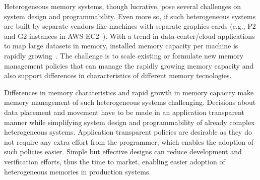 
Heterogeneous memory systems, though lucrative, pose several challenges on system
design and programmability. Even more so, if such heterogeneous systems are built by
separate vendors like machines with separate graphics cards (e.g., P2 and G2
instances in AWS EC2~\cite{awsinstances}). With a
trend in data-center/cloud applications to map large datasets in memory,
installed memory capacity per machine is rapidly growing~\cite{spark}. The
challenge is to scale existing or formulate new memory management policies that
can manage the rapidly growing memory capacity and also support differences in
characteristics of different memory tecnologies.


Differences in memory charateristics and rapid growth in memory capacity make
memory management of such heterogeneous systems challenging. Decisions about
data placement and movement have to be made in an application transparent manner
while simplifying system design and programmability of already complex
heterogeneous systems. Application transparent policies are desirable as they do
not require any extra effort from the programmer, which enables the adoption of
such policies easier. Simple but effective designs can reduce development and
verification efforts, thus the time to market, enabling easier adoption of
heterogeneous memories in production systems.

